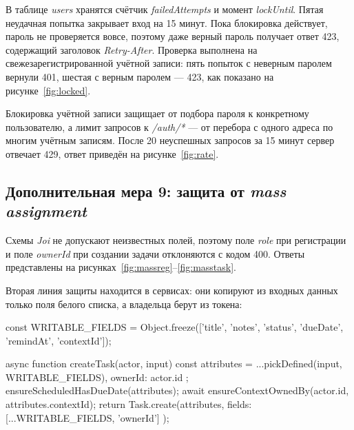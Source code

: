 \documentclass{stp}
\begin{document}
В таблице \textit{users} хранятся счётчик \textit{failedAttempts} и момент \textit{lockUntil}.
Пятая неудачная попытка закрывает вход на 15 минут. Пока блокировка
действует, пароль не проверяется вовсе, поэтому даже верный пароль
получает ответ 423, содержащий заголовок \textit{Retry-After}. Проверка выполнена на
свежезарегистрированной учётной записи: пять попыток с неверным паролем
вернули 401, шестая с верным паролем — 423, как показано на
рисунке~\ref{fig:locked}.


Блокировка учётной записи защищает от подбора пароля к конкретному
пользователю, а лимит запросов к \textit{/auth/*} — от перебора с одного адреса
по многим учётным записям. После 20 неуспешных запросов за 15 минут
сервер отвечает 429, ответ приведён на рисунке~\ref{fig:rate}.


\subsection{Дополнительная мера 9: защита от \textit{mass assignment}}

Схемы \textit{Joi} не допускают неизвестных полей, поэтому поле \textit{role} при
регистрации и поле \textit{ownerId} при создании задачи отклоняются с кодом 400.
Ответы представлены на рисунках~\ref{fig:massreg}--\ref{fig:masstask}.



Вторая линия защиты находится в сервисах: они копируют из входных данных
только поля белого списка, а владельца берут из токена:

\begin{stplisting}
const WRITABLE_FIELDS = Object.freeze(['title', 'notes',
  'status', 'dueDate', 'remindAt', 'contextId']);

async function createTask(actor, input) {
  const attributes = { ...pickDefined(input, WRITABLE_FIELDS),
    ownerId: actor.id };
  ensureScheduledHasDueDate(attributes);
  await ensureContextOwnedBy(actor.id, attributes.contextId);
  return Task.create(attributes,
    { fields: [...WRITABLE_FIELDS, 'ownerId'] });
}
\end{stplisting}
\end{document}
